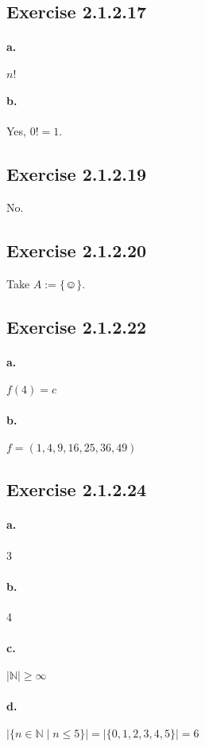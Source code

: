 \documentclass[14pt]{article}
\begin{document}
\subsection*{Exercise 2.1.2.17}
\paragraph{a.}
$n!\,$
\paragraph{b.}
Yes, $0! = 1$.

\subsection*{Exercise 2.1.2.19}
No.

\subsection*{Exercise 2.1.2.20}
Take $A := \{\smiley\}$.

\subsection*{Exercise 2.1.2.22}
\paragraph{a.}
$f(4) = c$
\paragraph{b.}
$f = \left(1,4,9,16,25,36,49\right)$

\subsection*{Exercise 2.1.2.24}
\paragraph{a.}
3
\paragraph{b.}
4
\paragraph{c.}
$\lvert\mathbb{N}\rvert \geqslant \infty$
\paragraph{d.}
$\lvert\lbrace n \in \mathbb{N} \mid n \leqslant 5 \rbrace \rvert =
 \lvert\lbrace 0,1,2,3,4,5\rbrace\rvert = 6$
\end{document}

